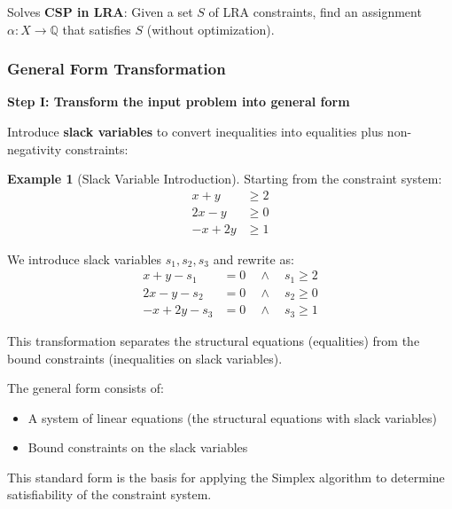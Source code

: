 \documentclass[11pt,a4paper]{article}
\theoremstyle{definition}
\newtheorem{example}{Example}[section]
\theoremstyle{plain}
\theoremstyle{remark}
\begin{document}
\begin{tcolorbox}[colback=cyan!5!white,colframe=cyan!75!black,title=\textbf{General Simplex Method}]
Solves \textbf{CSP in LRA}: Given a set $S$ of LRA constraints, find an assignment $\alpha: X \rightarrow \mathbb{Q}$ that satisfies $S$ (without optimization).
\end{tcolorbox}

\subsubsection{General Form Transformation}

\textbf{Step I: Transform the input problem into general form}

Introduce \textbf{slack variables} to convert inequalities into equalities plus non-negativity constraints:

\begin{example}[Slack Variable Introduction]
Starting from the constraint system:
\begin{align*}
x + y &\geq 2 \\
2x - y &\geq 0 \\
-x + 2y &\geq 1
\end{align*}

We introduce slack variables $s_1, s_2, s_3$ and rewrite as:
\begin{align*}
x + y - s_1 &= 0 \quad \land \quad s_1 \geq 2 \\
2x - y - s_2 &= 0 \quad \land \quad s_2 \geq 0 \\
-x + 2y - s_3 &= 0 \quad \land \quad s_3 \geq 1
\end{align*}

This transformation separates the structural equations (equalities) from the bound constraints (inequalities on slack variables).
\end{example}

\vspace{1em}

The general form consists of:
\begin{itemize}
    \item A system of linear equations (the structural equations with slack variables)
    \item Bound constraints on the slack variables
\end{itemize}

This standard form is the basis for applying the Simplex algorithm to determine satisfiability of the constraint system.
\end{document}
